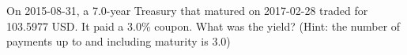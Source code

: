 On 2015-08-31, a 7.0-year Treasury that matured on 2017-02-28 traded for 103.5977 USD. It paid a 3.0\% coupon. What was the yield? (Hint: the number of payments up to and including maturity is 3.0)
